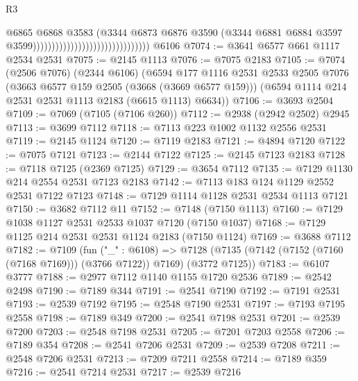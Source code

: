 \begin{lexlean}{R3}
\begin{coremodule}
                                                              @6865
                                                              @6868
                                                              @3583
                                                              (@3344
                                                                @6873
                                                                @6876
                                                                @3590
                                                                (@3344
                                                                  @6881
                                                                  @6884
                                                                  @3597
                                                                  @3599)))))))))))))))))))))))))))))))
    @6106
@7074 := @3641 @6577 @661 @1117 @2534 @2531
@7075 := @2145 @1113
@7076 := @7075 @2183
@7105 := @7074
    (@2506 @7076)
    (@2344 @6106)
    (@6594
      @177
      @1116
      @2531
      @2533
      @2505
      @7076
      (@3663 @6577 @159 @2505 (@3668 (@3669 @6577 @159)))
      (@6594 @1114 @214 @2531 @2531 @1113 @2183 (@6615 @1113) @6634))
@7106 := @3693 @2504
@7109 := @7069 (@7105 (@7106 @260))
@7112 := @2938 (@2942 @2502) @2945
@7113 := @3699 @7112
@7118 := @7113 @223 @1002 @1132 @2556 @2531
@7119 := @2145 @1124
@7120 := @7119 @2183
@7121 := @4894 @7120
@7122 := @7075 @7121
@7123 := @2144 @7122
@7125 := @2145 @7123 @2183
@7128 := @7118 @7125 (@2369 @7125)
@7129 := @3654 @7112
@7135 := @7129 @1130 @214 @2554 @2531 @7123 @2183
@7142 := @7113 @183 @124 @1129 @2552 @2531 @7122 @7123
@7148 := @7129 @1114 @1128 @2531 @2534 @1113 @7121
@7150 := @3682 @7112 @11
@7152 := @7148 (@7150 @1113)
@7160 := @7129 @1038 @1127 @2531 @2533 @1037 @7120 (@7150 @1037)
@7168 := @7129 @1125 @214 @2531 @2531 @1124 @2183 (@7150 @1124)
@7169 := @3688 @7112
@7182 := @7109
    (fun ("_" : @6108) =>
    @7128 (@7135 (@7142 (@7152 (@7160 (@7168 @7169))) (@3766 @7122)) @7169) (@3772 @7125))
@7183 := @6107 @3777
@7188 := @2977 @7112 @1140 @1155 @1720 @2536
@7189 := @2542 @2498
@7190 := @7189 @344
@7191 := @2541 @7190
@7192 := @7191 @2531
@7193 := @2539 @7192
@7195 := @2548 @7190 @2531
@7197 := @7193 @7195 @2558
@7198 := @7189 @349
@7200 := @2541 @7198 @2531
@7201 := @2539 @7200
@7203 := @2548 @7198 @2531
@7205 := @7201 @7203 @2558
@7206 := @7189 @354
@7208 := @2541 @7206 @2531
@7209 := @2539 @7208
@7211 := @2548 @7206 @2531
@7213 := @7209 @7211 @2558
@7214 := @7189 @359
@7216 := @2541 @7214 @2531
@7217 := @2539 @7216

\end{coremodule}
\end{lexlean}
